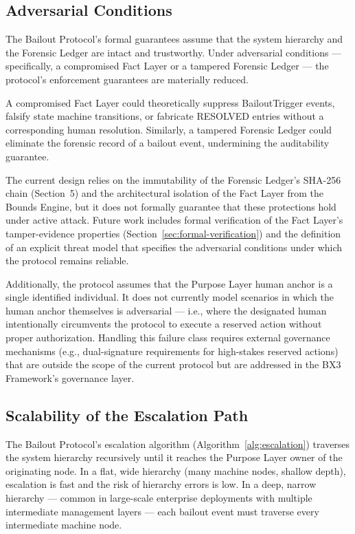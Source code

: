 \subsection{Adversarial Conditions}
\label{sec:adversarial-conditions}

The Bailout Protocol's formal guarantees assume that the system hierarchy and the Forensic Ledger are intact and trustworthy. Under adversarial conditions — specifically, a compromised Fact Layer or a tampered Forensic Ledger — the protocol's enforcement guarantees are materially reduced.

A compromised Fact Layer could theoretically suppress BailoutTrigger events, falsify state machine transitions, or fabricate RESOLVED entries without a corresponding human resolution. Similarly, a tampered Forensic Ledger could eliminate the forensic record of a bailout event, undermining the auditability guarantee.

The current design relies on the immutability of the Forensic Ledger's SHA-256 chain (Section~5) and the architectural isolation of the Fact Layer from the Bounds Engine, but it does not formally guarantee that these protections hold under active attack. Future work includes formal verification of the Fact Layer's tamper-evidence properties (Section~\ref{sec:formal-verification}) and the definition of an explicit threat model that specifies the adversarial conditions under which the protocol remains reliable.

Additionally, the protocol assumes that the Purpose Layer human anchor is a single identified individual. It does not currently model scenarios in which the human anchor themselves is adversarial — i.e., where the designated human intentionally circumvents the protocol to execute a reserved action without proper authorization. Handling this failure class requires external governance mechanisms (e.g., dual-signature requirements for high-stakes reserved actions) that are outside the scope of the current protocol but are addressed in the BX3 Framework's governance layer.

\subsection{Scalability of the Escalation Path}
\label{sec:scalability}

The Bailout Protocol's escalation algorithm (Algorithm~\ref{alg:escalation}) traverses the system hierarchy recursively until it reaches the Purpose Layer owner of the originating node. In a flat, wide hierarchy (many machine nodes, shallow depth), escalation is fast and the risk of hierarchy errors is low. In a deep, narrow hierarchy — common in large-scale enterprise deployments with multiple intermediate management layers — each bailout event must traverse every intermediate machine node.

